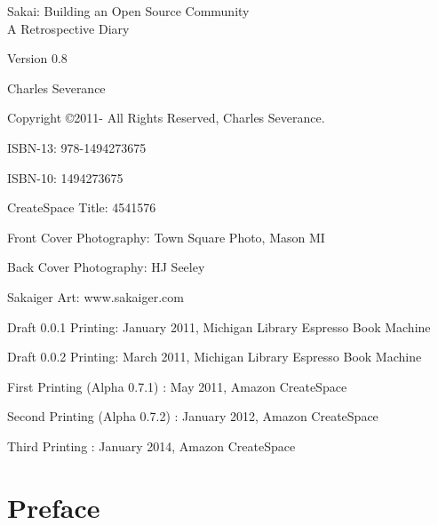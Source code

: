 \documentclass[12pt]{book}
\newcommand{\theversion}{0.8}
\begin{document}
\frontmatter

\thispagestyle{empty}

\pagebreak
\thispagestyle{empty}

\begin{flushright}
\vspace*{2.0in}

\begin{spacing}{3}
{\huge Sakai: Building an Open Source Community}\\
{\Large A Retrospective Diary}
\end{spacing}

\vspace{0.25in}

Version \theversion

\vspace{0.5in}


{\Large
Charles Severance\\
}


\vspace{2.25in}


\end{flushright}


\pagebreak
\thispagestyle{empty}

{\small
Copyright \copyright 2011- All Rights Reserved, Charles Severance.

ISBN-13: 978-1494273675 

ISBN-10: 1494273675 

CreateSpace Title: 4541576

Front Cover Photography: Town Square Photo, Mason MI

Back Cover Photography: HJ Seeley

Sakaiger Art: www.sakaiger.com

Draft 0.0.1 Printing: January 2011, Michigan Library Espresso Book Machine

Draft 0.0.2 Printing: March 2011, Michigan Library Espresso Book Machine

First Printing (Alpha 0.7.1) : May 2011, Amazon CreateSpace

Second Printing (Alpha 0.7.2) : January 2012, Amazon CreateSpace

Third Printing : January 2014, Amazon CreateSpace

} %

\chapter*{Preface}
\end{document}
